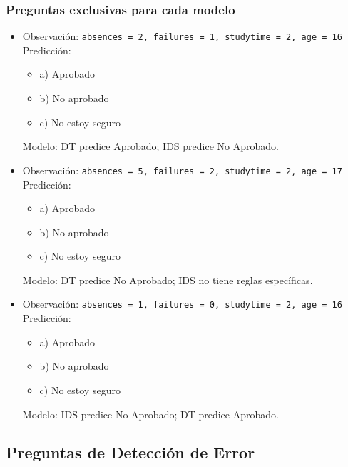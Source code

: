 \subsubsection{Preguntas exclusivas para cada modelo}
\begin{itemize}
    \item Observación: \texttt{absences = 2, failures = 1, studytime = 2, age = 16}\\
    Predicción:
    \begin{itemize}
        \item a) Aprobado
        \item b) No aprobado
        \item c) No estoy seguro
    \end{itemize}
    Modelo: DT predice Aprobado; IDS predice No Aprobado.

    \item Observación: \texttt{absences = 5, failures = 2, studytime = 2, age = 17}\\
    Predicción:
    \begin{itemize}
        \item a) Aprobado
        \item b) No aprobado
        \item c) No estoy seguro
    \end{itemize}
    Modelo: DT predice No Aprobado; IDS no tiene reglas específicas.

    \item Observación: \texttt{absences = 1, failures = 0, studytime = 2, age = 16}\\
    Predicción:
    \begin{itemize}
        \item a) Aprobado
        \item b) No aprobado
        \item c) No estoy seguro
    \end{itemize}
    Modelo: IDS predice No Aprobado; DT predice Aprobado.
\end{itemize}

\subsection{Preguntas de Detección de Error}

